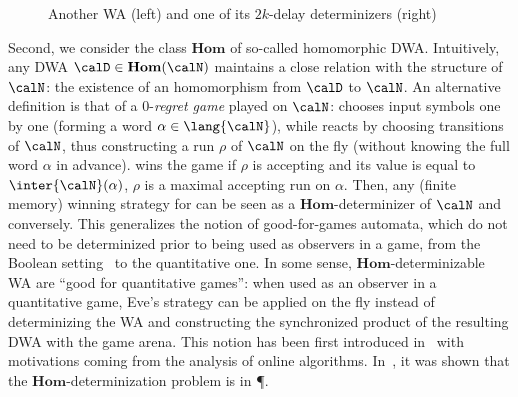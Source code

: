 \documentclass[a4paper]{article}
\begin{document}
\begin{figure}[h]
\begin{center}
\end{center}
\caption{Another WA (left) and one of its $2k$-delay determinizers (right)}
\label{fig:example22}
\end{figure}


Second, we consider the class $\mathbf{Hom}$ of so-called homomorphic
DWA. Intuitively, any DWA $\calD\in \mathbf{Hom}(\calN)$
maintains a close relation with the structure of $\calN$: the
existence of an homomorphism from $\calD$ to $\calN$. An alternative definition
is that of a $0$-\emph{regret game} \cite{hpr15-journal} played on $\calN$:
\adam chooses input symbols one by one (forming a word $\alpha \in
\lang{\calN}$), while \eve reacts by choosing transitions of $\calN$, thus
constructing a run $\rho$ of ${\calN}$ on the fly (\ie without knowing the full
word $\alpha$ in advance). \eve wins the game if $\rho$ is accepting and its
value is equal to $\inter{\calN}(\alpha)$, \ie $\rho$ is a maximal accepting run
on $\alpha$. Then, any (finite memory) winning strategy for \eve can be seen as
a $\mathbf{Hom}$-determinizer of $\calN$ and conversely.  This generalizes the
notion of good-for-games automata, which do not need to be determinized prior to
being used as observers in a game, from the Boolean setting~\cite{hp06} to the
quantitative one. In some sense, $\mathbf{Hom}$-determinizable WA are ``good for
quantitative games'': when used as an observer in a quantitative game, Eve's
strategy can be applied on the fly instead of determinizing the WA and
constructing the synchronized product of the resulting DWA with the game arena.
This notion has been first introduced in~\cite{akl10} with motivations coming
from the analysis of online algorithms.  In~\cite{akl10},  it was shown that the
$\mathbf{Hom}$-determinization problem is in \P.
\end{document}
